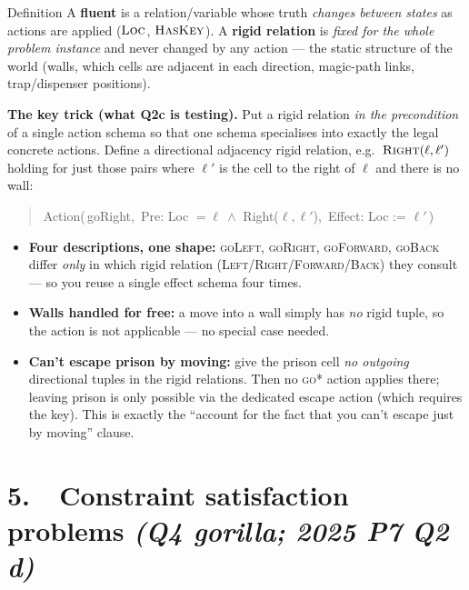 \documentclass[11pt,a4paper]{article}
\newcommand{\pred}[1]{\textsc{#1}}
\begin{document}
\begin{defbox}{Definition}
A \textbf{fluent} is a relation/variable whose truth \emph{changes between states} as actions are applied ($\pred{Loc}$, $\pred{HasKey}$). A \textbf{rigid relation} is \emph{fixed for the whole problem instance} and never changed by any action --- the static structure of the world (walls, which cells are adjacent in each direction, magic-path links, trap/dispenser positions).
\end{defbox}

\textbf{The key trick (what Q2c is testing).} Put a rigid relation \emph{in the precondition} of a single action schema so that one schema specialises into exactly the legal concrete actions. Define a directional adjacency rigid relation, e.g.\ $\pred{Right}(\ell,\ell')$ holding for just those pairs where $\ell'$ is the cell to the right of $\ell$ and there is no wall:
\begin{quote}\ttfamily
Action(\,goRight,\ Pre: Loc $=\ell\ \wedge$ Right($\ell,\ell'$),\ Effect: Loc := $\ell'$\,)
\end{quote}
\begin{itemize}[leftmargin=*,itemsep=1pt]
  \item \textbf{Four descriptions, one shape:} \pred{goLeft}, \pred{goRight}, \pred{goForward}, \pred{goBack} differ \emph{only} in which rigid relation (\pred{Left}/\pred{Right}/\pred{Forward}/\pred{Back}) they consult --- so you reuse a single effect schema four times.
  \item \textbf{Walls handled for free:} a move into a wall simply has \emph{no} rigid tuple, so the action is not applicable --- no special case needed.
  \item \textbf{Can't escape prison by moving:} give the prison cell \emph{no outgoing} directional tuples in the rigid relations. Then no \pred{go*} action applies there; leaving prison is only possible via the dedicated escape action (which requires the key). This is exactly the ``account for the fact that you can't escape just by moving'' clause.
\end{itemize}

\section*{5.\ \ Constraint satisfaction problems \hfill {\normalfont\itshape (Q4 gorilla; 2025 P7 Q2 d)}}
\end{document}
